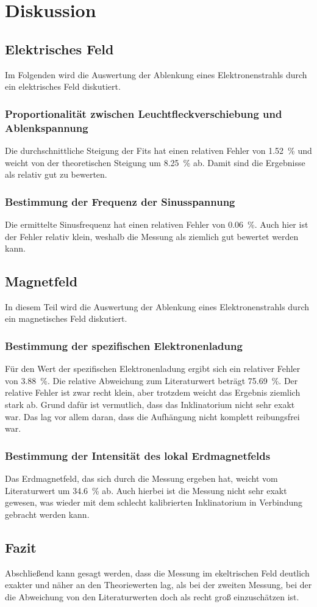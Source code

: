 \section{Diskussion}
\label{sec:Diskussion}

\subsection{Elektrisches Feld}
Im Folgenden wird die Auswertung der Ablenkung eines Elektronenstrahls durch ein elektrisches Feld diskutiert. 

\subsubsection{Proportionalität zwischen Leuchtfleckverschiebung und Ablenkspannung}
Die durchschnittliche Steigung der Fits hat einen relativen Fehler von \SI{1.52}{\percent} und weicht von der 
theoretischen Steigung um \SI{8.25}{\percent} ab. Damit sind die Ergebnisse als relativ gut zu bewerten.

\subsubsection{Bestimmung der Frequenz der Sinusspannung}
Die ermittelte Sinusfrequenz hat einen relativen Fehler von \SI{0.06}{\percent}. Auch hier ist der Fehler relativ klein, 
weshalb die Messung als ziemlich gut bewertet werden kann. 


\subsection{Magnetfeld}
In diesem Teil wird die Auswertung der Ablenkung eines Elektronenstrahls durch ein magnetisches Feld diskutiert. 

\subsubsection{Bestimmung der spezifischen Elektronenladung}
Für den Wert der spezifischen Elektronenladung ergibt sich ein relativer Fehler von \SI{3.88}{\percent}. Die relative 
Abweichung zum Literaturwert beträgt \SI{75.69}{\percent}. Der relative Fehler ist zwar recht klein, aber trotzdem weicht das Ergebnis 
ziemlich stark ab. 
Grund dafür ist vermutlich, dass das Inklinatorium nicht sehr exakt war. Das lag vor allem daran, dass die Aufhängung nicht komplett reibungsfrei war. 


\subsubsection{Bestimmung der Intensität des lokal Erdmagnetfelds}
Das Erdmagnetfeld, das sich durch die Messung ergeben hat, weicht vom Literaturwert um \SI{34.6}{\percent} ab. Auch hierbei ist die Messung 
nicht sehr exakt gewesen, was wieder mit dem schlecht kalibrierten Inklinatorium in Verbindung gebracht werden kann. 

\subsection{Fazit}
Abschließend kann gesagt werden, dass die Messung im ekeltrischen Feld deutlich exakter und näher an den Theoriewerten lag, als bei der 
zweiten Messung, bei der die Abweichung von den Literaturwerten doch als recht groß einzuschätzen ist. 
